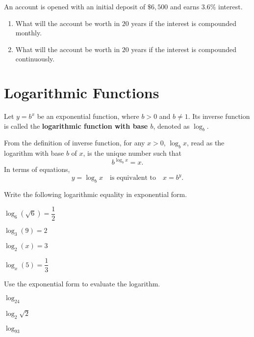 \begin{exercise}
  An account is opened with an initial deposit of $\$6,500$ and earns $3.6\%$ interest.
  
  \begin{enumerate}
    \item What will the account be worth in $20$ years if the interest is compounded monthly. 
    \item What will the account be worth in $20$ years if the interest is compounded continuously. 
  \end{enumerate}
\end{exercise}

\newpage
\section{Logarithmic Functions}
\begin{definition}
  Let $y=b^x$ be an exponential function, where $b>0$ and $b\ne 1$. Its inverse function is called the \textbf{logarithmic function with base $b$}, denoted as $\log_b$.
\end{definition}

From the definition of inverse function, for any $x>0$, $\log_bx$, read as the logarithm with base $b$ of $x$, is the unique number such that 
\[b^{\log_bx}=x.\] 
In terms of equations,
\[y=\log_bx\quad \text{is equivalent to}\quad x=b^y.\]

\begin{example}
  Write the following logarithmic equality in exponential form.\\
\begin{enumerate*}
  \item $\log_6(\sqrt{6})=\dfrac{1}{2}$
  \item $\log_3(9)=2$
  \item $\log_2(x)=3$
  \item $\log_x(5)=\dfrac{1}{3}$\hfill\null
\end{enumerate*}
\end{example}

\begin{example}
  Use the exponential form to evaluate the logarithm.\\
  \begin{enumerate*}
    \item $\log_24$
    \item $\log_2\sqrt{2}$
    \item $\log_93$\hfill\null
  \end{enumerate*}
\end{example}

